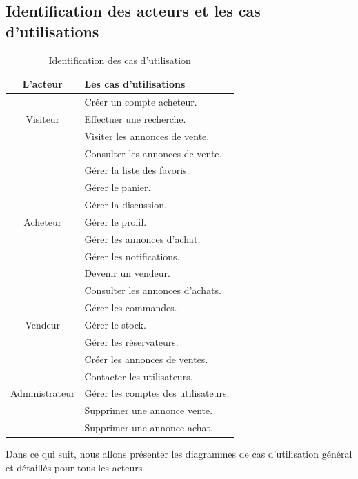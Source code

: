 \documentclass[edit,12pt,a4paper,ChapStyle,oneside,doubleinterligne]{report}
\begin{document}
\subsection{Identification des acteurs et les cas d'utilisations}
\begin{table}[h!]
    \centering
    \begin{tabular}{|c|l|}
    \hline
        L’acteur    & Les cas d’utilisations\\ \hline
                    & Créer un compte acheteur. \\
        Visiteur    & Effectuer une recherche.\\
                    & Visiter les annonces de vente.\\ \hline
                    & Consulter les annonces de vente.\\
                    & Gérer la liste des favoris.\\
                    & Gérer le panier.\\
                    & Gérer la discussion.\\
        Acheteur    & Gérer le profil.\\
                    & Gérer les annonces d'achat.\\
                    & Gérer les notifications.\\
                    & Devenir un vendeur.\\ \hline
                    & Consulter les annonces d'achats.\\
                    & Gérer les commandes.\\
        Vendeur     & Gérer le stock.\\
                    & Gérer les réservateurs.\\
                    & Créer les annonces de ventes. \\ \hline
                    & Contacter les utilisateurs.\\
    Administrateur  & Gérer les comptes des utilisateurs.\\
                    & Supprimer une annonce vente. \\
                    & Supprimer une annonce achat.   \\\hline
    \end{tabular}
    \caption{Identification des cas d’utilisation}
    \label{tab:Identification des cas d’utilisations}
\end{table}
Dans ce qui suit, nous allons présenter les diagrammes de cas d'utilisation général et détaillés pour tous les acteurs
\clearpage
\end{document}
